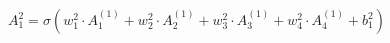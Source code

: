 \documentclass[preview]{standalone}
\begin{document}
\begin{align*}
A_{1}^{2} =\sigma \left(w_{1}^{2} \cdot A_{1}^{(1)}+w_{2}^{2} \cdot A_{2}^{(1)}+w_{3}^{2} \cdot A_{3}^{(1)}+w_{4}^{2} \cdot A_{4}^{(1)}+b_{1}^{2}\right)
\end{align*}
\end{document}
